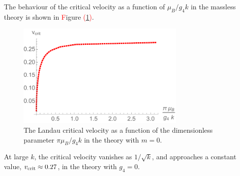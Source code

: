 The behaviour of the critical velocity as a function of $\mu_B/g_4 k$ in the massless theory is shown in \textcolor{red}{F}igure \textcolor{red}{(}\ref{vcrit}\textcolor{red}{)}.
 \begin{figure}[h]
\begin{center}
\includegraphics[height=2.0in]{Chapter_3_Folder_1806.06976/figures/vcrit.pdf}
\end{center}
     \caption[This figure shows the Landau critical velocity as a function of the dimensionless parameter $\pi\frac{\mu_B}{g_4 k}$ in the theory with $m=0$.]{ \small{The Landau critical velocity as a function of the dimensionless parameter $\pi\mu_B/g_4 k$ in the theory with $m=0$.}}
\label{vcrit}
\end{figure}
 At large $k$, the critical velocity vanishes as $1/\sqrt{k}$, and approaches a constant value, $v_{\rm crit}\approx 0.27$, in the theory with $g_4=0$.
